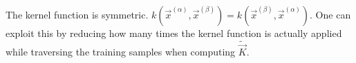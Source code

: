 \begin{frame}{\subsecname}


\pause

The kernel function is symmetric. $k(\vec x^{(\alpha)}, \vec x^{(\beta)}) = k(\vec x^{(\beta)}, \vec x^{(\alpha)})$. One can exploit this by reducing how many times the kernel function is actually applied while traversing the training samples when computing $\widetilde {\vec{K}}$.

\end{frame}






